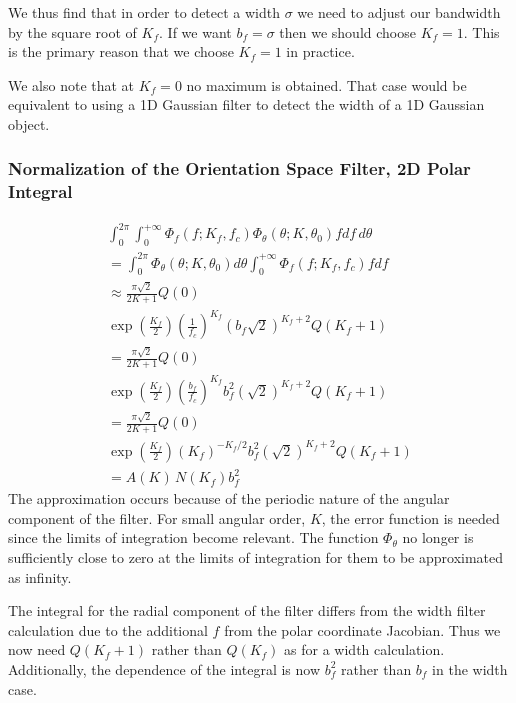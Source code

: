 \documentclass{article}
\begin{document}
We thus find that in order to detect a width $ \sigma $ we need to adjust our bandwidth by the square root of $ K_f $. If we want $ b_f = \sigma $ then we should choose $ K_f = 1 $. This is the primary reason that we choose $ K_f = 1 $ in practice.

We also note that at $ K_f = 0 $ no maximum is obtained. That case would be equivalent to using a 1D Gaussian filter to detect the width of a 1D Gaussian object.
\subsubsection{Normalization of the Orientation Space Filter, 2D Polar Integral}
\begin{eqnarray}
\int_0^{2 \pi} \int_0^{+\infty} \Phi_f(f; K_f, f_c) \Phi_\theta(\theta; K, \theta_0) f df \, d\theta \\
 = \int_0^{2 \pi} \Phi_\theta(\theta; K, \theta_0) d\theta
 \int_0^{+\infty} \Phi_f(f; K_f, f_c)  f df \\
 \approx \frac{\pi \sqrt{2}}{2K+1}  Q(0) \\
 \exp \left(\frac{K_f}{2} \right)
            \left( \frac{1}{f_c} \right)^{K_f}
            \left( b_f \sqrt{2} \right)^{K_f+2}
            Q(K_f + 1) \\
             = \frac{\pi \sqrt{2}}{2K+1}  Q(0) \\
 \exp \left(\frac{K_f}{2} \right)
            \left( \frac{b_f}{f_c} \right)^{K_f}
            b_f^2
            \left( \sqrt{2} \right)^{K_f+2}
            Q(K_f + 1) \\            
             = \frac{\pi \sqrt{2}}{2K+1}  Q(0) \\
 \exp \left(\frac{K_f}{2} \right)
            \left( K_f \right)^{-K_f/2}
            b_f^2
            \left( \sqrt{2} \right)^{K_f+2}
            Q(K_f + 1) \\      
= 	    A(K) \, N(K_f) b_f^2
\end{eqnarray}
The approximation occurs because of the periodic nature of the angular component of the filter. For small angular order, $ K $, the error function is needed since the limits of integration become relevant. The function $ \Phi_\theta $ no longer is sufficiently close to zero at the limits of integration for them to be approximated as infinity.

The integral for the radial component of the filter differs from the width filter calculation due to the additional $ f $ from the polar coordinate Jacobian. Thus we now need $ Q(K_f+1) $ rather than $ Q(K_f) $ as for a width calculation. Additionally, the dependence of the integral is now $ b_f^2 $ rather than $ b_f $ in the width case.
\end{document}
